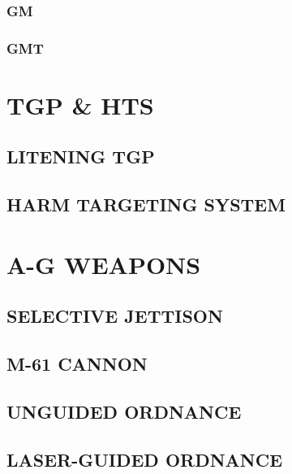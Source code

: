 \documentclass[fontInter]{TechCheck}
\begin{document}
	\subsection{GM}

	\subsection{GMT}

	\cleardoublepage

	\chapter{TGP \& HTS}
	\minitoc
	\cleardoublepage

	\section{LITENING TGP}

	\clearpage 

	\section{HARM TARGETING SYSTEM}

	\cleardoublepage

	\chapter{A-G WEAPONS}
	\minitoc
	\cleardoublepage

	\section{SELECTIVE JETTISON}

	\clearpage

	\section{M-61 CANNON}

	\clearpage 

	\section{UNGUIDED ORDNANCE}

	\clearpage 

	\section{LASER-GUIDED ORDNANCE}
\end{document}
